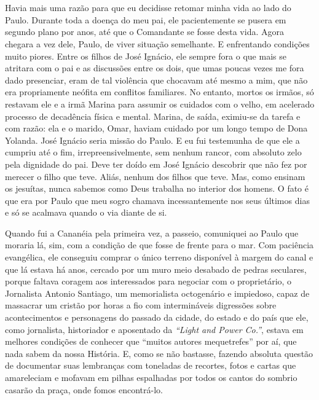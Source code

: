 \chapter{}

Havia mais uma razão para que eu decidisse retomar minha vida ao lado do Paulo.
Durante toda a doença do meu pai, ele pacientemente se pusera em segundo plano por anos, até que o Comandante se fosse desta vida.
Agora chegara a vez dele, Paulo, de viver situação semelhante.
E enfrentando condições muito piores.
Entre os filhos de José Ignácio, ele sempre fora o que mais se atritara com o pai e as discussões entre os dois, que umas poucas vezes me fora dado presenciar, eram de tal violência que chocavam até mesmo a mim, que não era propriamente neófita em conflitos familiares.
No entanto, mortos os irmãos, só restavam ele e a irmã Marina para assumir os cuidados com o velho, em acelerado processo de decadência física e mental.
Marina, de saída, eximiu-se da tarefa e com razão: ela e o marido, Omar, haviam cuidado por um longo tempo de Dona Yolanda.
José Ignácio seria missão do Paulo.
E eu fui testemunha de que ele a cumpriu até o fim, irrepreensivelmente, sem nenhum rancor, com absoluto zelo pela dignidade do pai.
Deve ter doído em José Ignácio descobrir que não fez por merecer o filho que teve.
Aliás, nenhum dos filhos que teve.
Mas, como ensinam os jesuítas, nunca sabemos como Deus trabalha no interior dos homens.
O fato é que era por Paulo que meu sogro chamava incessantemente nos seus últimos dias e só se acalmava quando o via diante de si.

Quando fui a Cananéia pela primeira vez, a passeio, comuniquei ao Paulo que moraria lá, sim, com a condição de que fosse de frente para o mar.
Com paciência evangélica, ele conseguiu comprar o único terreno disponível à margem do canal e que lá estava há anos, cercado por um muro meio desabado de pedras seculares, porque faltava coragem aos interessados para negociar com o proprietário, o Jornalista Antonio Santiago, um memorialista octogenário e impiedoso, capaz de massacrar um cristão por horas a fio com intermináveis digressões sobre acontecimentos e personagens do passado da cidade, do estado e do país que ele, como jornalista, historiador e aposentado da \textit{``Light and Power Co.''}, estava em melhores condições de conhecer que ``muitos autores mequetrefes'' por aí, que nada sabem da nossa História.
E, como se não bastasse, fazendo absoluta questão de documentar suas lembranças com toneladas de recortes, fotos e cartas que amareleciam e mofavam em pilhas espalhadas por todos os cantos do sombrio casarão da praça, onde fomos encontrá-lo.


